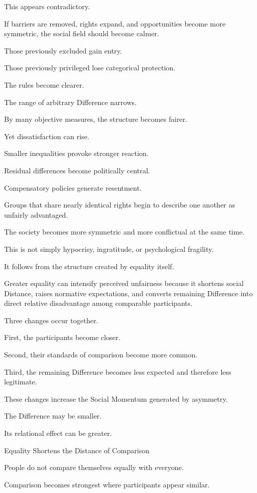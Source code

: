 This appears contradictory.

If barriers are removed, rights expand, and opportunities become more symmetric, the social field should become calmer.

Those previously excluded gain entry.

Those previously privileged lose categorical protection.

The rules become clearer.

The range of arbitrary Difference narrows.

By many objective measures, the structure becomes fairer.

Yet dissatisfaction can rise.

Smaller inequalities provoke stronger reaction.

Residual differences become politically central.

Compensatory policies generate resentment.

Groups that share nearly identical rights begin to describe one another as unfairly advantaged.

The society becomes more symmetric and more conflictual at the same time.

This is not simply hypocrisy, ingratitude, or psychological fragility.

It follows from the structure created by equality itself.

Greater equality can intensify perceived unfairness because it shortens social Distance, raises normative expectations, and converts remaining Difference into direct relative disadvantage among comparable participants.

Three changes occur together.

First, the participants become closer.

Second, their standards of comparison become more common.

Third, the remaining Difference becomes less expected and therefore less legitimate.

These changes increase the Social Momentum generated by asymmetry.

The Difference may be smaller.

Its relational effect can be greater.

Equality Shortens the Distance of Comparison

People do not compare themselves equally with everyone.

Comparison becomes strongest where participants appear similar.

